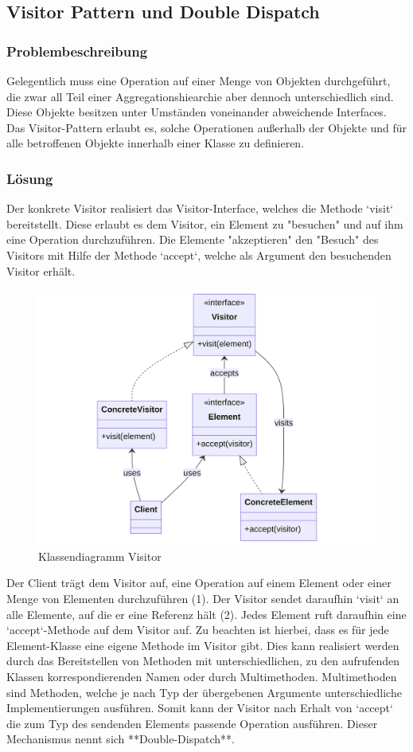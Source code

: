 \subsection{Visitor Pattern und Double Dispatch}


\subsubsection*{Problembeschreibung}

Gelegentlich muss eine Operation auf einer Menge von Objekten durchgeführt, die zwar all Teil einer Aggregationshiearchie aber dennoch unterschiedlich sind.  Diese Objekte besitzen unter Umständen voneinander abweichende Interfaces. Das Visitor-Pattern erlaubt es, solche Operationen außerhalb der Objekte und für alle betroffenen Objekte innerhalb einer Klasse zu definieren.

\subsubsection*{Lösung}

Der konkrete Visitor realisiert das Visitor-Interface, welches die Methode `visit` bereitstellt. Diese erlaubt es dem Visitor, ein Element zu "besuchen" und auf ihm eine Operation durchzuführen. Die Elemente "akzeptieren" den "Besuch" des Visitors mit Hilfe der Methode `accept`, welche als Argument den besuchenden Visitor erhält.

\begin{figure}[!hb]
	\centering
	\includegraphics[width=0.75\linewidth]{images/patterns/visitor-class.png}
	\caption{Klassendiagramm Visitor}
	\label{fig:visitor-class}
\end{figure}

Der Client trägt dem Visitor auf, eine Operation auf einem Element oder einer Menge von Elementen durchzuführen (1). Der Visitor sendet daraufhin `visit` an alle Elemente, auf die er eine Referenz hält (2). Jedes Element ruft daraufhin eine `accept`-Methode auf dem Visitor auf. Zu beachten ist hierbei, dass es für jede Element-Klasse eine eigene Methode im Visitor gibt. Dies kann realisiert werden durch das Bereitstellen von Methoden mit unterschiedlichen, zu den aufrufenden Klassen korrespondierenden Namen oder durch Multimethoden. Multimethoden sind Methoden, welche je nach Typ der übergebenen Argumente unterschiedliche Implementierungen ausführen. Somit kann der Visitor nach Erhalt von `accept` die zum Typ des sendenden Elements passende Operation ausführen. Dieser Mechanismus nennt sich **Double-Dispatch**. 

